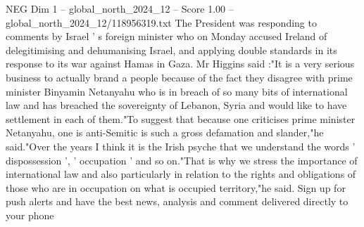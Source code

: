 \begin{textsample}{NEG Dim 1 – global\_north\_2024\_12 – Score 1.00 – global\_north\_2024\_12/118956319.txt}
The President was responding to comments by Israel ' s foreign minister who on Monday accused Ireland of delegitimising and dehumanising Israel, and applying double standards in its response to its war against Hamas in Gaza.
Mr Higgins said :"It is a very serious business to actually brand a people because of the fact they disagree with prime minister Binyamin Netanyahu who is in breach of so many bits of international law and has breached the sovereignty of Lebanon, Syria and would like to have settlement in each of them."To suggest that because one criticises prime minister Netanyahu, one is anti-Semitic is such a gross defamation and slander,"he said."Over the years I think it is the Irish psyche that we understand the words ' dispossession ', ' occupation ' and so on."That is why we stress the importance of international law and also particularly in relation to the rights and obligations of those who are in occupation on what is occupied territory,"he said.
Sign up for push alerts and have the best news, analysis and comment delivered directly to your phone

\end{textsample}
